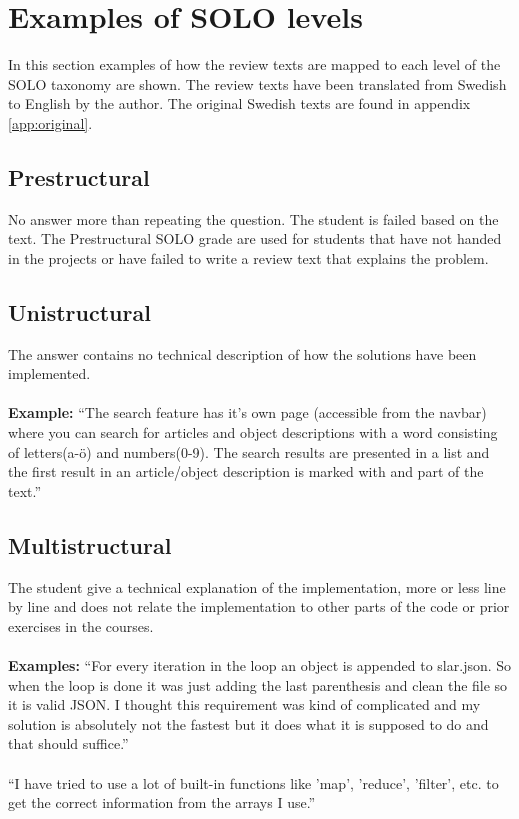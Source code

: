 \documentclass[twoside,twocolumn,a4paper,11pt,english]{article}
\begin{document}

\section{Examples of SOLO levels} \label{sec:examples}

In this section examples of how the review texts are mapped to each level of the SOLO taxonomy are shown. The review texts have been translated from Swedish to English by the author. The original Swedish texts are found in appendix \ref{app:original}.

\subsection{Prestructural}

No answer more than repeating the question. The student is failed based on the text. The Prestructural SOLO grade are used for students that have not handed in the projects or have failed to write a review text that explains the problem.

\subsection{Unistructural}

The answer contains no technical description of how the solutions have been implemented.
\\
\\
\textbf{Example:} ``The search feature has it's own page (accessible from the navbar) where you can search for articles and object descriptions with a word consisting of letters(a-ö) and numbers(0-9). The search results are presented in a list and the first result in an article/object description is marked with and part of the text.''

\subsection{Multistructural}

The student give a technical explanation of the implementation, more or less line by line and does not relate the implementation to other parts of the code or prior exercises in the courses.
\\
\\
\textbf{Examples:} ``For every iteration in the loop an object is appended to slar.json. So when the loop is done it was just adding the last parenthesis and clean the file so it is valid JSON. I thought this requirement was kind of complicated and my solution is absolutely not the fastest but it does what it is supposed to do and that should suffice.''
\\
\\
``I have tried to use a lot of built-in functions like 'map', 'reduce', 'filter', etc. to get the correct information from the arrays I use.''
\end{document}
